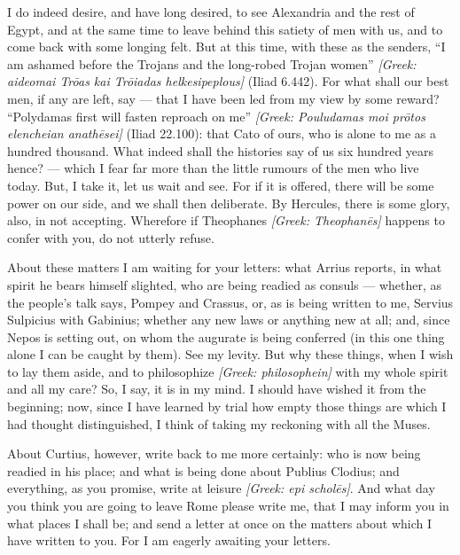 

 I do indeed desire, and have long desired, to see Alexandria and the rest of Egypt, and at the same time to leave behind this satiety of men with us, and to come back with some longing felt. But at this time, with these as the senders, ``I am ashamed before the Trojans and the long-robed Trojan women'' \textit{[Greek: aideomai Tr\=oas kai Tr\=oiadas helkesipeplous]} (Iliad 6.442). For what shall our best men, if any are left, say --- that I have been led from my view by some reward? ``Polydamas first will fasten reproach on me'' \textit{[Greek: Pouludamas moi pr\=otos elencheian anath\=esei]} (Iliad 22.100): that Cato of ours, who is alone to me as a hundred thousand. What indeed shall the histories say of us six hundred years hence? --- which I fear far more than the little rumours of the men who live today. But, I take it, let us wait and see. For if it is offered, there will be some power on our side, and we shall then deliberate. By Hercules, there is some glory, also, in not accepting. Wherefore if Theophanes \textit{[Greek: Theophan\=es]} happens to confer with you, do not utterly refuse.

 About these matters I am waiting for your letters: what Arrius reports, in what spirit he bears himself slighted, who are being readied as consuls --- whether, as the people's talk says, Pompey and Crassus, or, as is being written to me, Servius Sulpicius with Gabinius; whether any new laws or anything new at all; and, since Nepos is setting out, on whom the augurate is being conferred (in this one thing alone I can be caught by them). See my levity. But why these things, when I wish to lay them aside, and to philosophize \textit{[Greek: philosophein]} with my whole spirit and all my care? So, I say, it is in my mind. I should have wished it from the beginning; now, since I have learned by trial how empty those things are which I had thought distinguished, I think of taking my reckoning with all the Muses.

 About Curtius, however, write back to me more certainly: who is now being readied in his place; and what is being done about Publius Clodius; and everything, as you promise, write at leisure \textit{[Greek: epi schol\=es]}. And what day you think you are going to leave Rome please write me, that I may inform you in what places I shall be; and send a letter at once on the matters about which I have written to you. For I am eagerly awaiting your letters.
